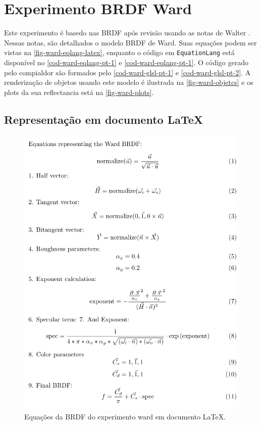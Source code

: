 \section{Experimento BRDF Ward}

Este experimento é basedo nas BRDF após revisão usando as notas de Walter \cite{walter2005notes}. Nessas notas, são detalhados o modelo BRDF de Ward. Suas equações podem ser vistas na \autoref{fig-ward-eqlang-latex}, enquanto o código em \texttt{EquationLang} está disponível no \autoref{cod-ward-eqlang-pt-1} e \autoref{cod-ward-eqlang-pt-1}. O código gerado pelo compialdor são formados pelo \autoref{cod-ward-glsl-pt-1} e \autoref{cod-ward-glsl-pt-2}. A renderização de objetos usando este modelo é ilustrada na \autoref{fig-ward-objetcs} e os plots da sua reflectancia está na \autoref{fig-ward-plots}.

\subsection{Representação em documento \LaTeX{}}
\begin{figure}[H]
    \caption{\label{fig-ward-eqlang-latex} \small Equações da BRDF do experimento ward em documento \LaTeX{}.}
    \begin{center}
        \includegraphics[scale=0.92]{./Imagens/brdfs/ward.pdf}
    \end{center}
\end{figure}

